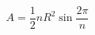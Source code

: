 \documentclass[12pt]{article}
\begin{document}
\[
    A = \frac{1}{2}nR^2\sin \frac{2\pi}{n}
\]
\end{document}
